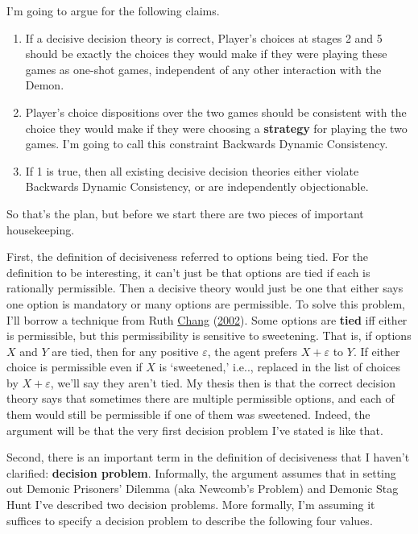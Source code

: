 \documentclass[
  12pt,
]{article}
\providecommand{\tightlist}{%
  \setlength{\itemsep}{0pt}\setlength{\parskip}{0pt}}
\begin{document}
I'm going to argue for the following claims.

\begin{enumerate}
\def\labelenumi{\arabic{enumi}.}
\tightlist
\item
  If a decisive decision theory is correct, Player's choices at stages 2
  and 5 should be exactly the choices they would make if they were
  playing these games as one-shot games, independent of any other
  interaction with the Demon.
\item
  Player's choice dispositions over the two games should be consistent
  with the choice they would make if they were choosing a
  \textbf{strategy} for playing the two games. I'm going to call this
  constraint Backwards Dynamic Consistency.
\item
  If 1 is true, then all existing decisive decision theories either
  violate Backwards Dynamic Consistency, or are independently
  objectionable.
\end{enumerate}

So that's the plan, but before we start there are two pieces of
important housekeeping.

First, the definition of decisiveness referred to options being tied.
For the definition to be interesting, it can't just be that options are
tied if each is rationally permissible. Then a decisive theory would
just be one that either says one option is mandatory or many options are
permissible. To solve this problem, I'll borrow a technique from Ruth
\protect\hyperlink{ref-Chang2002}{Chang}
(\protect\hyperlink{ref-Chang2002}{2002}). Some options are
\textbf{tied} iff either is permissible, but this permissibility is
sensitive to sweetening. That is, if options \(X\) and \(Y\) are tied,
then for any positive \(\varepsilon\), the agent prefers
\(X + \varepsilon\) to \(Y\). If either choice is permissible even if
\(X\) is `sweetened,' i.e.., replaced in the list of choices by
\(X + \varepsilon\), we'll say they aren't tied. My thesis then is that
the correct decision theory says that sometimes there are multiple
permissible options, and each of them would still be permissible if one
of them was sweetened. Indeed, the argument will be that the very first
decision problem I've stated is like that.

Second, there is an important term in the definition of decisiveness
that I haven't clarified: \textbf{decision problem}. Informally, the
argument assumes that in setting out Demonic Prisoners' Dilemma (aka
Newcomb's Problem) and Demonic Stag Hunt I've described two decision
problems. More formally, I'm assuming it suffices to specify a decision
problem to describe the following four values.
\end{document}
